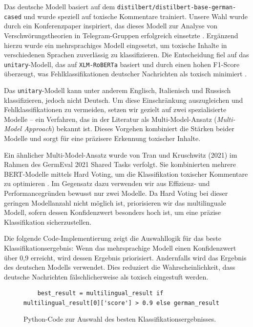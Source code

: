 \documentclass[12pt]{report}
\begin{document}
Das deutsche Modell basiert auf dem \texttt{distilbert/distilbert-base-german-cased} und wurde speziell auf toxische Kommentare trainiert. Unsere Wahl wurde durch ein Konferenzpaper inspiriert, das dieses Modell zur Analyse von Verschwörungstheorien in Telegram-Gruppen erfolgreich einsetzte \cite{weigand-etal-2022-conspiracy}. Ergänzend hierzu wurde ein mehrsprachiges Modell eingesetzt, um toxische Inhalte in verschiedenen Sprachen zuverlässig zu klassifizieren. Die Entscheidung fiel auf das \texttt{unitary}-Modell, das auf \texttt{XLM-RoBERTa} basiert und durch einen hohen F1-Score überzeugt, was Fehlklassifikationen deutscher Nachrichten als toxisch minimiert \cite{model-comparison}.\newline

Das \texttt{unitary}-Modell kann unter anderem Englisch, Italienisch und Russisch klassifizieren, jedoch nicht Deutsch. Um diese Einschränkung auszugleichen und Fehlklassifikationen zu vermeiden, setzen wir gezielt auf zwei spezialisierte Modelle – ein Verfahren, das in der Literatur als Multi-Model-Ansatz (\textit{Multi-Model Approach}) bekannt ist. Dieses Vorgehen kombiniert die Stärken beider Modelle und sorgt für eine präzisere Erkennung toxischer Inhalte.\newline

Ein ähnlicher Multi-Model-Ansatz wurde von Tran und Kruschwitz (2021) im Rahmen des GermEval 2021 Shared Tasks verfolgt. Sie kombinierten mehrere BERT-Modelle mittels Hard Voting, um die Klassifikation toxischer Kommentare zu optimieren \cite{tran2021ensemble}. Im Gegensatz dazu verwenden wir aus Effizienz- und Performancegründen bewusst nur zwei Modelle. Da Hard Voting bei dieser geringen Modellanzahl nicht möglich ist, priorisieren wir das multilinguale Modell, sofern dessen Konfidenzwert besonders hoch ist, um eine präzise Klassifikation sicherzustellen.\newline

Die folgende Code-Implementierung zeigt die Auswahllogik für das beste Klassifikationsergebnis: Wenn das mehrsprachige Modell einen Konfidenzwert über 0,9 erreicht, wird dessen Ergebnis priorisiert. Andernfalls wird das Ergebnis des deutschen Modells verwendet. Dies reduziert die Wahrscheinlichkeit, dass deutsche Nachrichten fälschlicherweise als toxisch eingestuft werden.
\begin{figure}[h]
	\centering
\begin{lstlisting}
	best_result = multilingual_result if multilingual_result[0]['score'] > 0.9 else german_result
\end{lstlisting}
\caption{Python-Code zur Auswahl des besten Klassifikationsergebnisses.}
\label{fig:best_result_selection}
\end{figure}
\end{document}
